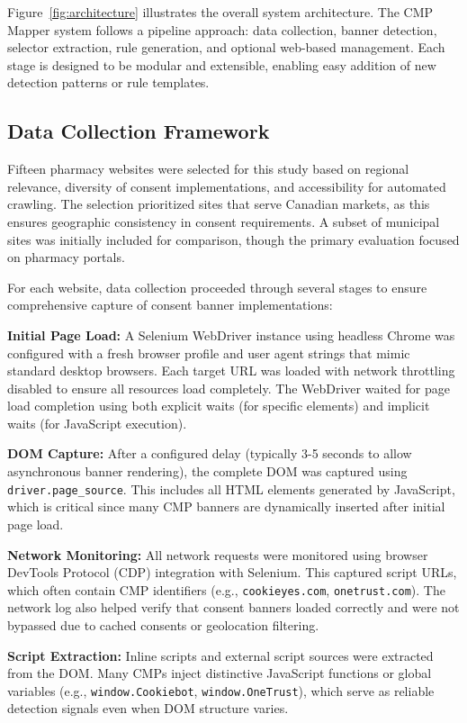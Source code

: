 \documentclass[conference]{IEEEtran}
\begin{document}
Figure~\ref{fig:architecture} illustrates the overall system architecture. The CMP Mapper system follows a pipeline approach: data collection, banner detection, selector extraction, rule generation, and optional web-based management. Each stage is designed to be modular and extensible, enabling easy addition of new detection patterns or rule templates.

\subsection{Data Collection Framework}

Fifteen pharmacy websites were selected for this study based on regional relevance, diversity of consent implementations, and accessibility for automated crawling. The selection prioritized sites that serve Canadian markets, as this ensures geographic consistency in consent requirements. A subset of municipal sites was initially included for comparison, though the primary evaluation focused on pharmacy portals.

For each website, data collection proceeded through several stages to ensure comprehensive capture of consent banner implementations:

\textbf{Initial Page Load:} A Selenium WebDriver instance using headless Chrome was configured with a fresh browser profile and user agent strings that mimic standard desktop browsers. Each target URL was loaded with network throttling disabled to ensure all resources load completely. The WebDriver waited for page load completion using both explicit waits (for specific elements) and implicit waits (for JavaScript execution).

\textbf{DOM Capture:} After a configured delay (typically 3-5 seconds to allow asynchronous banner rendering), the complete DOM was captured using \texttt{driver.page\_source}. This includes all HTML elements generated by JavaScript, which is critical since many CMP banners are dynamically inserted after initial page load.

\textbf{Network Monitoring:} All network requests were monitored using browser DevTools Protocol (CDP) integration with Selenium. This captured script URLs, which often contain CMP identifiers (e.g., \texttt{cookieyes.com}, \texttt{onetrust.com}). The network log also helped verify that consent banners loaded correctly and were not bypassed due to cached consents or geolocation filtering.

\textbf{Script Extraction:} Inline scripts and external script sources were extracted from the DOM. Many CMPs inject distinctive JavaScript functions or global variables (e.g., \texttt{window.Cookiebot}, \texttt{window.OneTrust}), which serve as reliable detection signals even when DOM structure varies.
\end{document}
